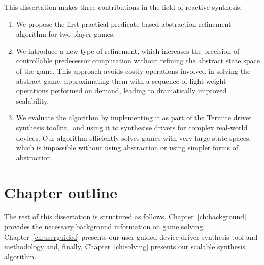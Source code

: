 This dissertation makes three contributions in the field of reactive synthesis:
\begin{enumerate}
    \item We propose the first practical predicate-based abstraction refinement algorithm for two-player games.

    \item We introduce a new type of refinement, which increases the precision of controllable predecessor computation without refining the abstract state space of the game.  This approach avoids costly operations involved in solving the abstract game, approximating them with a sequence of light-weight operations performed on demand, leading to dramatically improved scalability.

    \item We evaluate the algorithm by implementing it as part of the Termite driver synthesis toolkit~\cite{Ryzhyk_WKLRSV_14} and using it to synthesise drivers for complex real-world devices.  Our algorithm efficiently solves games with very large state spaces, which is impossible without using abstraction or using simpler forms of abstraction.
\end{enumerate}

\section{Chapter outline}

The rest of this dissertation is structured as follows. Chapter~\ref{ch:background} provides the necessary background information on game solving. Chapter~\ref{ch:userguided} presents our user guided device driver synthesis tool and methodology and, finally, Chapter~\ref{ch:solving} presents our scalable synthesis algorithm.
